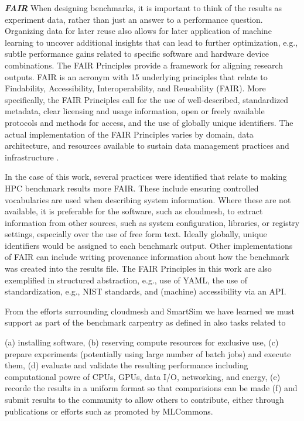 \documentclass[utf8]{FrontiersinVancouver} %
\begin{document}
\textbf{\textit{FAIR}}
When designing benchmarks, it is important to think of the results as experiment data, rather than just an answer to a performance question. Organizing data for later reuse also allows for later application of machine learning to uncover additional insights that can lead to further optimization, e.g., subtle performance gains related to specific software and hardware device combinations. The FAIR Principles provide a framework for aligning research outputs. FAIR is an acronym with 15 underlying principles that relate to Findability, Accessibility, Interoperability, and Reusability (FAIR)\citep{wilkinson2016fair}. More specifically, the FAIR Principles call for the use of well-described, standardized metadata, clear licensing and usage information, open or freely available protocols and methods for access, and the use of globally unique identifiers. The actual implementation of the FAIR Principles varies by domain, data architecture, and resources available to sustain data management practices and infrastructure \citep{jacobsen2020fair}.

In the case of this work, several practices were identified that relate to making HPC benchmark results more FAIR\citep{kirkpatrick2024}. These include ensuring controlled vocabularies are used when describing system information. Where these are not available, it is preferable for the software, such as cloudmesh, to extract information from other sources, such as system configuration, libraries, or registry settings, especially over the use of free form text. Ideally globally, unique identifiers would be assigned to each benchmark output. Other implementations of FAIR can include writing provenance information about how the benchmark was created into the results file. The FAIR Principles in this work are also exemplified in structured abstraction, e.g., use of YAML, the use of standardization, e.g., NIST standards, and (machine) accessibility via an API. 

From the efforts surrounding cloudmesh and SmartSim we have learned we must support as part of the benchmark carpentry as defined in \citep{??earthquake} also tasks related to 

(a) installing software, (b) reserving compute resources for exclusive use, (c) prepare experiments (potentially using large number of batch jobs) and execute them, (d) evaluate and validate the resulting performance including computational powre of CPUs, GPUs, data I/O, networking, and energy, (e) recorde the results in a uniform format so that comparisions can be made (f) and submit results to the community to allow others to contribute, either through publications or efforts such as promoted by MLCommons.
\end{document}
